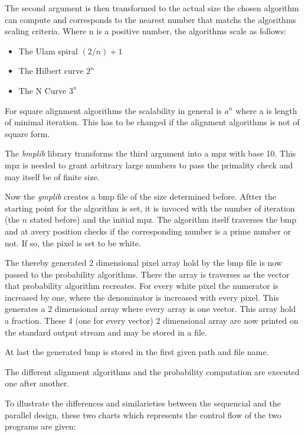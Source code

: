 The second argument is then transformed to the actual size the chosen algorithm can compute and corresponds to the nearest number that matchs the algorithms scaling criteria. Where n is a positive number, the algorithms scale as follows:
\begin{itemize}
   \item The Ulam spiral
      $(2/n)+1$
   \item The Hilbert curve
      $2^n$
   \item The N Curve
      $3^n$
\end{itemize}
For square alignment algorithms the scalability in general is $a^n$ where a is length of minimal iteration. This has to be changed if the alignment algorithms is not of square form.

The \emph{bmplib} library transforms the third argument into a mpz with base 10. This mpz is needed to grant arbitrary large numbers to pass the primality check and may itself be of finite size.

Now the \emph{gmplib} creates a bmp file of the size determined before. Aftter the starting point for the algorithm is set, it is invoced with the number of iteration (the $n$ stated before) and the initial mpz. The algorithm itself traverses the bmp and at avery position checks if the corresponding number is a prime number or not. If so, the pixel is set to be white.

The thereby generated 2 dimensional pixel array hold by the bmp file is now passed to the probability algorithms. There the array is traverses as the vector that probability algorithm recreates. For every white pixel the numerator is increased by one, where the denominator is increased with every pixel. This generates a 2 dimensional array where every array is one vector. This array hold a fraction. These 4 (one for every vector) 2 dimensional array are now printed on the  standard output stream and may be stored in a file.

At last the generated bmp is stored in the first given path and file name.

The different alignment algorithms and the probability computation are executed one after another.

To illustrate the differences and similarieties between the sequencial and the parallel design, these two charts which represents the control flow of the two programs are given:

\begin{figure}[H]
\begin{minipage}[t]{0.475\textwidth}
\centering
\end{minipage}
\hfill
\begin{minipage}[t]{0.475\textwidth}
\centering
\end{minipage}
\end{figure}

